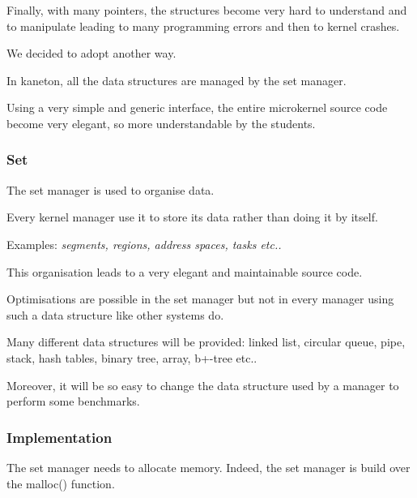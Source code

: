 {\begin{frame}
  \nl

  Finally, with many pointers, the structures become very hard to understand
  and to manipulate leading to many programming errors and then to kernel
  crashes.

  \nl

  We decided to adopt another way.

  \nl

  In kaneton, all the data structures are managed by the set manager.

  \nl

  Using a very simple and generic interface, the entire microkernel source
  code become very elegant, so more understandable by the students.
\end{frame}


\begin{frame}
  \frametitle{Set}

  The set manager is used to organise data.

  \nl

  Every kernel manager use it to store its data rather than doing it
  by itself.

  \nl

  Examples: \textit{segments, regions, address spaces, tasks etc..}

  \nl

  This organisation leads to a very elegant and maintainable source code.

  \nl

  Optimisations are possible in the set manager \alert{but} not in every
  manager using such a data structure like other systems do.

  \nl

  Many different data structures will be provided: linked list, circular
  queue, pipe, stack, hash tables, binary tree, array, b+-tree etc..

  \nl

  Moreover, it will be so easy to change the data structure used by a manager
  to perform some benchmarks.
\end{frame}


\begin{frame}
  \frametitle{Implementation}

  The set manager needs to allocate memory. Indeed, the set manager
  is build over the malloc() function.

  \nl


\end{frame}}
